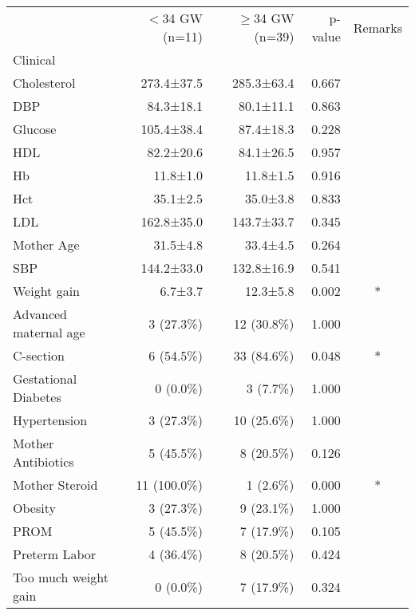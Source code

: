 \begin{tabular}{lrrrc}
\toprule
{} & $<$34 GW (n=11) & $\ge$34 GW (n=39) & p-value & Remarks \\
Clinical              &               &               &         &         \\
\midrule
Cholesterol           &    273.4±37.5 &    285.3±63.4 &   0.667 &         \\
DBP                   &     84.3±18.1 &     80.1±11.1 &   0.863 &         \\
Glucose               &    105.4±38.4 &     87.4±18.3 &   0.228 &         \\
HDL                   &     82.2±20.6 &     84.1±26.5 &   0.957 &         \\
Hb                    &      11.8±1.0 &      11.8±1.5 &   0.916 &         \\
Hct                   &      35.1±2.5 &      35.0±3.8 &   0.833 &         \\
LDL                   &    162.8±35.0 &    143.7±33.7 &   0.345 &         \\
Mother Age            &      31.5±4.8 &      33.4±4.5 &   0.264 &         \\
SBP                   &    144.2±33.0 &    132.8±16.9 &   0.541 &         \\
Weight gain           &       6.7±3.7 &      12.3±5.8 &   0.002 &       * \\
Advanced maternal age &     3 (27.3\%) &    12 (30.8\%) &   1.000 &         \\
C-section             &     6 (54.5\%) &    33 (84.6\%) &   0.048 &       * \\
Gestational Diabetes  &      0 (0.0\%) &      3 (7.7\%) &   1.000 &         \\
Hypertension          &     3 (27.3\%) &    10 (25.6\%) &   1.000 &         \\
Mother Antibiotics    &     5 (45.5\%) &     8 (20.5\%) &   0.126 &         \\
Mother Steroid        &   11 (100.0\%) &      1 (2.6\%) &   0.000 &       * \\
Obesity               &     3 (27.3\%) &     9 (23.1\%) &   1.000 &         \\
PROM                  &     5 (45.5\%) &     7 (17.9\%) &   0.105 &         \\
Preterm Labor         &     4 (36.4\%) &     8 (20.5\%) &   0.424 &         \\
Too much weight gain  &      0 (0.0\%) &     7 (17.9\%) &   0.324 &         \\
\bottomrule
\end{tabular}

